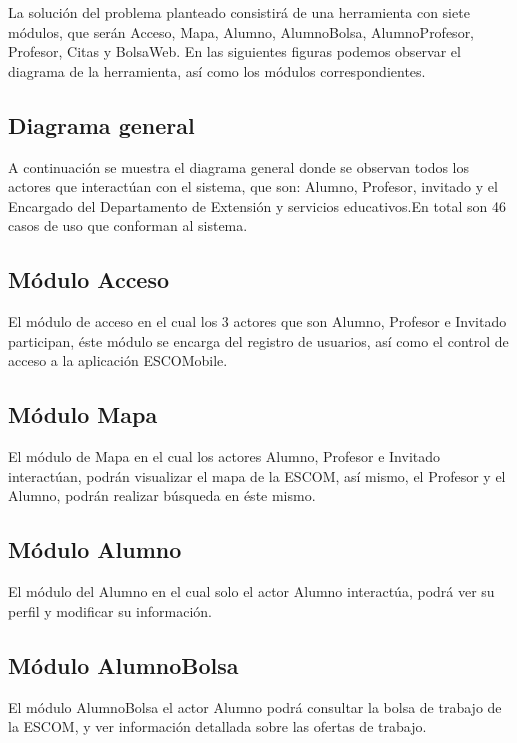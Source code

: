 \noindent
La solución del problema planteado consistirá de una herramienta con siete
módulos, que serán Acceso, Mapa, Alumno, AlumnoBolsa, AlumnoProfesor, Profesor, Citas y BolsaWeb. En las siguientes figuras podemos observar el
diagrama de la herramienta, así como los módulos correspondientes.


\subsection{Diagrama general}
\noindent 
A continuación se muestra el diagrama general donde se observan todos los actores que interactúan con el sistema, que son: Alumno, Profesor, invitado y el Encargado del Departamento de Extensión y servicios educativos.En total son 46 casos de uso que conforman al sistema.

\pagebreak

\subsection{Módulo Acceso}
\noindent
El módulo de acceso en el cual los 3 actores que son Alumno, Profesor e Invitado participan, éste módulo se encarga del registro de usuarios, así como el control de acceso a la aplicación ESCOMobile.




\subsection{Módulo Mapa}
\noindent
El módulo de Mapa en el cual los actores Alumno, Profesor e Invitado interactúan, podrán visualizar el mapa de la ESCOM, así mismo, el Profesor y el Alumno, podrán realizar búsqueda en éste mismo.




\pagebreak
\subsection{Módulo Alumno}
\noindent
El módulo del Alumno en el cual solo el actor Alumno interactúa, podrá ver su perfil y modificar su información.

\pagebreak
\subsection{Módulo AlumnoBolsa}
\noindent
El módulo AlumnoBolsa el actor Alumno podrá consultar la bolsa de trabajo de la ESCOM, y ver información detallada sobre las ofertas de trabajo.

